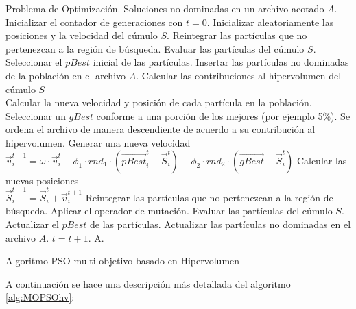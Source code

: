 \begin{algorithm}
\begin{algorithmic}[1]
	\REQUIRE Problema de Optimizaci\'on.
	\ENSURE Soluciones no dominadas en un archivo acotado $A$.	  
	  \STATE Inicializar el contador de generaciones con $t=0$.
	  \STATE Inicializar aleatoriamente las posiciones y la velocidad del c\'umulo $S$.
	  \STATE Reintegrar las part\'iculas que no pertenezcan a la regi\'on de b\'usqueda.
	  \STATE Evaluar las part\'iculas del c\'umulo $S$.
	  \STATE Seleccionar el $pBest$ inicial de las part\'iculas.  
	  \STATE Insertar las part\'iculas no dominadas de la poblaci\'on en el archivo $A$.
	  \STATE Calcular las contribuciones al hipervolumen del c\'umulo $S$
	  \\ Calcular la nueva velocidad y posici\'on de cada part\'icula en la poblaci\'on.
	     \STATE Seleccionar un $gBest$ conforme a una porci\'on de los mejores (por ejemplo 5\%). Se ordena el archivo
	     de manera descendiente de acuerdo a su contribuci\'on al hipervolumen.
	     \STATE Generar una nueva velocidad 
		\\  $\vec{v}^{t+1}_{i} = \omega \cdot \vec{v}^t_{i} + \phi_1 \cdot rnd_1 \cdot \left(\vec{pBest}^t_i - \vec{S}^t_{i} \right) 
					    + \phi_2 \cdot rnd_2 \cdot \left(\vec{gBest} - \vec{S}^t_{i} \right)$
	      \STATE Calcular las nuevas posiciones 
		\\$\vec{S}^{t+1}_{i}=\vec{S}^{t}_{i}+\vec{v}^{t+1}_{i}$
	     \ENDFOR
		\STATE Reintegrar las part\'iculas que no pertenezcan a la regi\'on de b\'usqueda.
		\STATE Aplicar el operador de mutaci\'on.
		\STATE Evaluar las part\'iculas del c\'umulo $S$.
		\STATE Actualizar el $pBest$ de las part\'iculas.  
		\STATE Actualizar las part\'iculas no dominadas en el archivo $A$.	
		\STATE $t=t+1$.
	\ENDWHILE
	\RETURN A.
	\end{algorithmic}
	\caption{Algoritmo PSO multi-objetivo basado en Hipervolumen}
	\label{alg:MOPSOhv}
	\end{algorithm}

A continuaci\'on se hace una descripci\'on m\'as detallada del algoritmo \ref{alg:MOPSOhv}:
	
